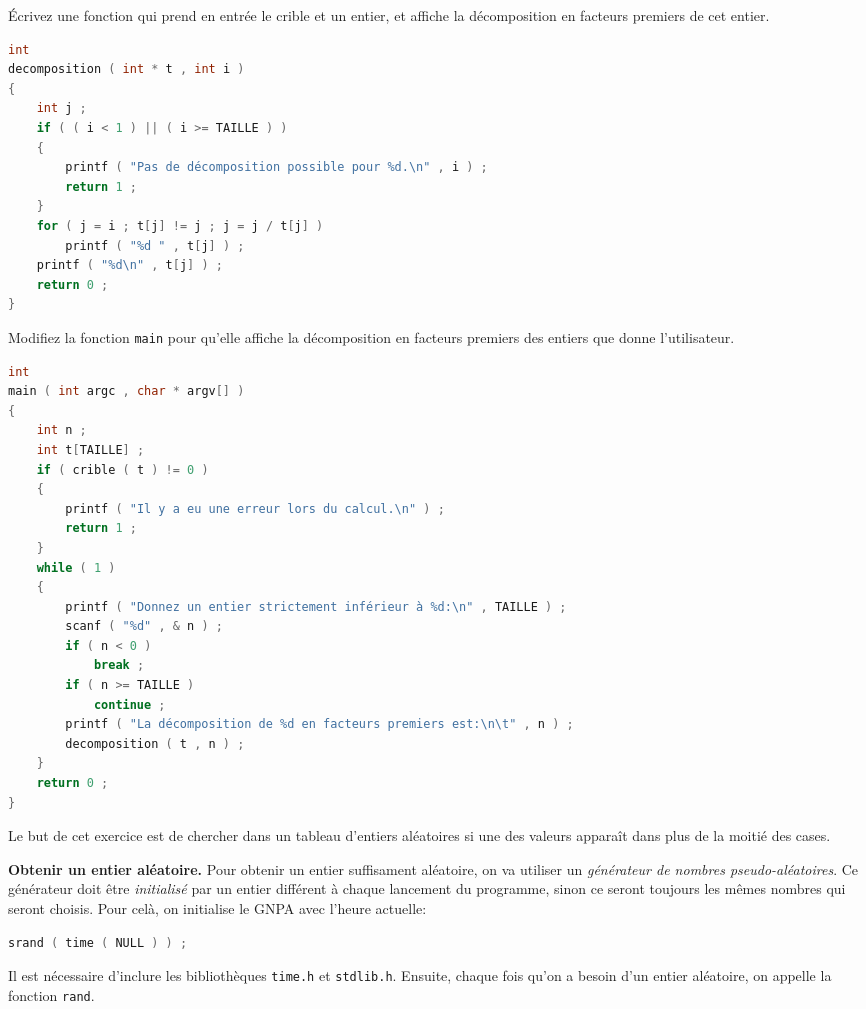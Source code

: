 \question Écrivez une fonction qui prend en entrée le crible et un
entier, et affiche la décomposition en facteurs premiers de cet
entier.


\begin{solutioncachee}
  \begin{lstlisting}[language=C]
int
decomposition ( int * t , int i )
{
    int j ;
    if ( ( i < 1 ) || ( i >= TAILLE ) )
    {
        printf ( "Pas de décomposition possible pour %d.\n" , i ) ;
        return 1 ;
    }
    for ( j = i ; t[j] != j ; j = j / t[j] )
        printf ( "%d " , t[j] ) ;
    printf ( "%d\n" , t[j] ) ;
    return 0 ;
}
  \end{lstlisting}
\end{solutioncachee}

\question Modifiez la fonction \texttt{main} pour qu'elle affiche la
décomposition en facteurs premiers des entiers que donne
l'utilisateur.

\begin{solutioncachee}
  \begin{lstlisting}[language=C]
int
main ( int argc , char * argv[] )
{
    int n ;
    int t[TAILLE] ;
    if ( crible ( t ) != 0 )
    {
        printf ( "Il y a eu une erreur lors du calcul.\n" ) ;
        return 1 ;
    }
    while ( 1 )
    {
        printf ( "Donnez un entier strictement inférieur à %d:\n" , TAILLE ) ;
        scanf ( "%d" , & n ) ;
        if ( n < 0 )
            break ;
        if ( n >= TAILLE )
            continue ;
        printf ( "La décomposition de %d en facteurs premiers est:\n\t" , n ) ;
        decomposition ( t , n ) ;
    }
    return 0 ;
}
  \end{lstlisting}
\end{solutioncachee}


Le but de cet exercice est de chercher dans un tableau d'entiers
aléatoires si une des valeurs apparaît dans plus de la moitié des
cases.

\begin{fminipage}{0.9\textwidth}
  \textbf{Obtenir un entier aléatoire.} Pour obtenir un entier
  suffisament aléatoire, on va utiliser un \emph{générateur de nombres
    pseudo-aléatoires}. Ce générateur doit être \emph{initialisé} par
  un entier différent à chaque lancement du programme, sinon ce seront
  toujours les mêmes nombres qui seront choisis. Pour celà, on
  initialise le GNPA avec l'heure actuelle:
  \begin{lstlisting}[language=C]
    srand ( time ( NULL ) ) ;
  \end{lstlisting}
  Il est nécessaire d'inclure les bibliothèques \texttt{time.h} et
  \texttt{stdlib.h}. Ensuite, chaque fois qu'on a besoin d'un entier
  aléatoire, on appelle la fonction \texttt{rand}.
\end{fminipage}

